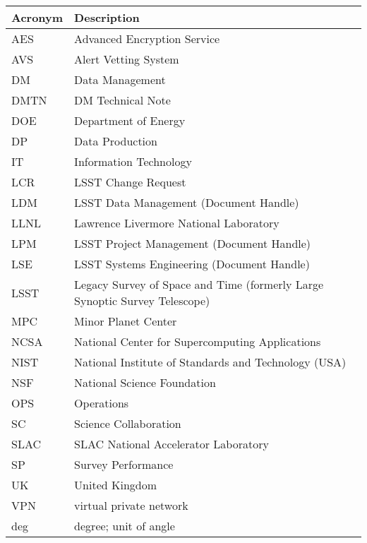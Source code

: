\addtocounter{table}{-1}
\begin{longtable}{p{}p{}}\hline
\textbf{Acronym} & \textbf{Description}  \\\hline

AES & Advanced Encryption Service \\\hline
AVS &  Alert Vetting System \\\hline
DM & Data Management \\\hline
DMTN & DM Technical Note \\\hline
DOE & Department of Energy \\\hline
DP & Data Production \\\hline
IT & Information Technology \\\hline
LCR & LSST Change Request \\\hline
LDM & LSST Data Management (Document Handle) \\\hline
LLNL & Lawrence Livermore National Laboratory \\\hline
LPM & LSST Project Management (Document Handle) \\\hline
LSE & LSST Systems Engineering (Document Handle) \\\hline
LSST & Legacy Survey of Space and Time (formerly Large Synoptic Survey Telescope) \\\hline
MPC & Minor Planet Center \\\hline
NCSA & National Center for Supercomputing Applications \\\hline
NIST & National Institute of Standards and Technology (USA) \\\hline
NSF & National Science Foundation \\\hline
OPS & Operations \\\hline
SC & Science Collaboration \\\hline
SLAC & SLAC National Accelerator Laboratory \\\hline
SP & Survey Performance \\\hline
UK & United Kingdom \\\hline
VPN & virtual private network \\\hline
deg & degree; unit of angle \\\hline
\end{longtable}
